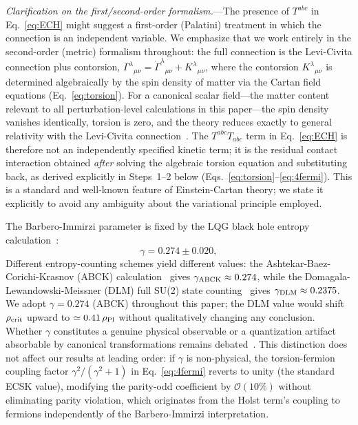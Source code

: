 \documentclass[aps,prd,twocolumn,superscriptaddress,showpacs,preprintnumbers,nofootinbib,longbibliography,floatfix]{revtex4-2}
\begin{document}
\textit{Clarification on the first/second-order formalism.}---The presence of $T^{abc}$ in Eq.~\eqref{eq:ECH} might suggest a first-order (Palatini) treatment in which the connection is an independent variable. We emphasize that we work entirely in the second-order (metric) formalism throughout: the full connection is the Levi-Civita connection plus contorsion, $\Gamma^\lambda{}_{\mu\nu} = \mathring{\Gamma}^\lambda{}_{\mu\nu} + K^\lambda{}_{\mu\nu}$, where the contorsion $K^\lambda{}_{\mu\nu}$ is determined algebraically by the spin density of matter via the Cartan field equations (Eq.~\ref{eq:torsion}). For a canonical scalar field---the matter content relevant to all perturbation-level calculations in this paper---the spin density vanishes identically, torsion is zero, and the theory reduces exactly to general relativity with the Levi-Civita connection~\cite{Hehl1976}. The $T^{abc}T_{abc}$ term in Eq.~\eqref{eq:ECH} is therefore not an independently specified kinetic term; it is the residual contact interaction obtained \textit{after} solving the algebraic torsion equation and substituting back, as derived explicitly in Steps~1--2 below (Eqs.~\ref{eq:torsion}--\ref{eq:4fermi}). This is a standard and well-known feature of Einstein-Cartan theory; we state it explicitly to avoid any ambiguity about the variational principle employed.

The Barbero-Immirzi parameter is fixed by the LQG black hole entropy calculation~\cite{Ashtekar2011,ABCK1998}:
\begin{equation}\label{eq:gamma}
\gamma = 0.274 \pm 0.020,
\end{equation}
Different entropy-counting schemes yield different values: the Ashtekar-Baez-Corichi-Krasnov (ABCK) calculation~\cite{ABCK1998} gives $\gamma_{\rm ABCK} \approx 0.274$, while the Domagala-Lewandowski-Meissner (DLM) full SU(2) state counting~\cite{Domagala2004,Meissner2004} gives $\gamma_{\rm DLM} \approx 0.2375$. We adopt $\gamma = 0.274$ (ABCK) throughout this paper; the DLM value would shift $\rho_{\rm crit}$ upward to $\simeq 0.41\,\rho_{\rm Pl}$ without qualitatively changing any conclusion. Whether $\gamma$ constitutes a genuine physical observable or a quantization artifact absorbable by canonical transformations remains debated~\cite{Freidel2005,Mercuri2006}. This distinction does not affect our results at leading order: if $\gamma$ is non-physical, the torsion-fermion coupling factor $\gamma^2/(\gamma^2+1)$ in Eq.~\eqref{eq:4fermi} reverts to unity (the standard ECSK value), modifying the parity-odd coefficient by $\mathcal{O}(10\%)$ without eliminating parity violation, which originates from the Holst term's coupling to fermions independently of the Barbero-Immirzi interpretation.
\end{document}
